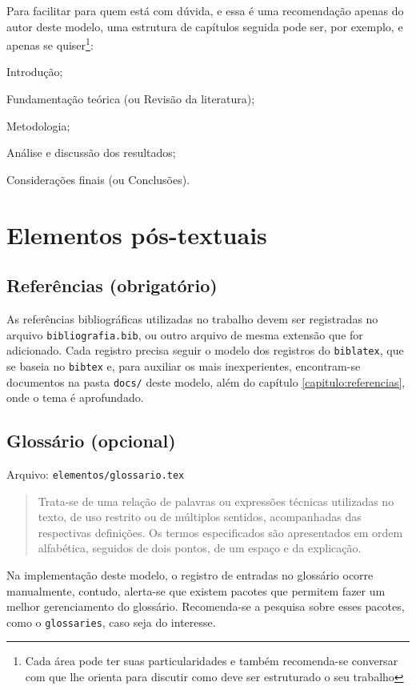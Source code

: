     Para facilitar para quem está com dúvida, e essa é uma recomendação apenas do autor deste modelo, uma estrutura de capítulos seguida pode ser, por exemplo, e apenas se quiser\footnote{Cada área pode ter suas particularidades e também recomenda-se conversar com que lhe orienta para discutir como deve ser estruturado o seu trabalho}: 
        \begin{alinea}
            \item Introdução;
            \item Fundamentação teórica (ou Revisão da literatura);
            \item Metodologia;
            \item Análise e discussão dos resultados;
            \item Considerações finais (ou Conclusões).
        \end{alinea}

\section{Elementos pós-textuais}

\subsection{Referências (obrigatório)}
    As referências bibliográficas utilizadas no trabalho devem ser registradas no arquivo \texttt{bibliografia.bib}, ou outro arquivo de mesma extensão que for adicionado. Cada registro precisa seguir o modelo dos registros do \texttt{biblatex}, que se baseia no \texttt{bibtex} e, para auxiliar os mais inexperientes, encontram-se documentos na pasta \texttt{docs/} deste modelo, além do capítulo \ref{capitulo:referencias}, onde o tema é aprofundado.

\subsection{Glossário (opcional)}
    Arquivo: \texttt{elementos/glossario.tex}
    
    \blockcquote[p. 33]{livro:iffar-guia-normalizacao-2022}{Trata-se de uma relação de palavras ou expressões técnicas utilizadas no texto, de uso restrito ou de múltiplos sentidos, acompanhadas das respectivas definições. Os termos especificados são apresentados em ordem alfabética, seguidos de dois pontos, de um espaço e da
    explicação.}

    Na implementação deste modelo, o registro de entradas no glossário ocorre manualmente, contudo, alerta-se que existem pacotes que permitem fazer um melhor gerenciamento do glossário. Recomenda-se a pesquisa sobre esses pacotes, como o \texttt{glossaries}, caso seja do interesse.

